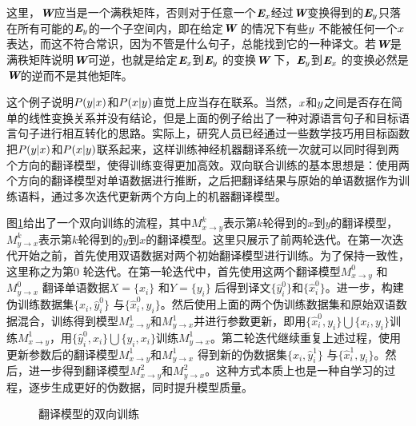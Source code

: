 \noindent 这里，$\textbf{\em W}$应当是一个满秩矩阵，否则对于任意一个$\textbf{\em E}_x$经过$\textbf{\em W}$变换得到的$\textbf{\em E}_y$只落在所有可能的$\textbf{\em E}_y$的一个子空间内，即在给定$\textbf{\em W}$ 的情况下有些${y}$ 不能被任何一个${x}$表达，而这不符合常识，因为不管是什么句子，总能找到它的一种译文。若$\textbf{\em W}$是满秩矩阵说明$\textbf{\em W}$可逆，也就是给定$\textbf{\em E}_x$到$\textbf{\em E}_y$ 的变换$\textbf{\em W}$ 下，$\textbf{\em E}_y$到$\textbf{\em E}_x$ 的变换必然是$\textbf{\em W}$的逆而不是其他矩阵。

\parinterval 这个例子说明${P}({y}|{x})$和${P}({x}|{y})$直觉上应当存在联系。当然，${x}$和${y}$之间是否存在简单的线性变换关系并没有结论，但是上面的例子给出了一种对源语言句子和目标语言句子进行相互转化的思路。实际上，研究人员已经通过一些数学技巧用目标函数把${P}({y}|{x})$和${P}({x}|{y})$联系起来，这样训练神经机器翻译系统一次就可以同时得到两个方向的翻译模型，使得训练变得更加高效。双向联合训练的基本思想是：使用两个方向的翻译模型对单语数据进行推断，之后把翻译结果与原始的单语数据作为训练语料，通过多次迭代更新两个方向上的机器翻译模型。

\parinterval 图\ref{fig:16-9}给出了一个双向训练的流程，其中$M_{x \rightarrow y}^{k}$表示第$k$轮得到的$x$到$y$的翻译模型，$M_{y \rightarrow x}^{k}$表示第$k$轮得到的$y$到$x$的翻译模型。这里只展示了前两轮迭代。在第一次迭代开始之前，首先使用双语数据对两个初始翻译模型进行训练。为了保持一致性，这里称之为第0 轮迭代。在第一轮迭代中，首先使用这两个翻译模型$M_{x \rightarrow y}^{0}$ 和$M_{y \rightarrow x}^{0}$ 翻译单语数据$X=\{ x_i \}$ 和$Y= \{ y_i \}$ 后得到译文$\{\hat{y}_i^{0} \}$和$\{ \hat{x}_i^{0}\}$。进一步，构建伪训练数据集$\{ x_i,\hat{y}_i^{0}\}$ 与$\{ \hat{x}_i^{0},y_i \}$。然后使用上面的两个伪训练数据集和原始双语数据混合，训练得到模型$M_{x \rightarrow y}^{1}$和$M_{y \rightarrow x}^{1}$并进行参数更新，即用$\{ \hat{x}_i^{0},y_i\} \bigcup \{ x_i,y_i\}$训练$M_{x \rightarrow y}^{1}$，用$\{ \hat{y}_i^{0},x_i\} \bigcup \{ y_i,x_i\}$训练$M_{y \rightarrow x}^{1}$。第二轮迭代继续重复上述过程，使用更新参数后的翻译模型$M_{x \rightarrow y}^{1}$和$M_{y \rightarrow x}^{1}$ 得到新的伪数据集$\{ x_i,\hat{y}_i^{1}\}$ 与$\{ \hat{x}_i^{1},y_i \}$。然后，进一步得到翻译模型$M_{x \rightarrow y}^{2}$和$M_{y \rightarrow x}^{2}$。这种方式本质上也是一种自学习的过程，逐步生成更好的伪数据，同时提升模型质量。

\begin{figure}[h]
\centering

\caption{翻译模型的双向训练}
\label{fig:16-9}
\end{figure}
